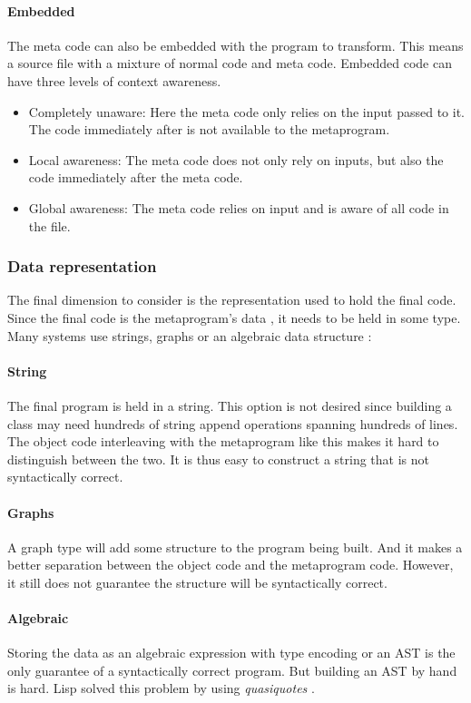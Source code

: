 \paragraph{Embedded}
The meta code can also be embedded with the program to transform.
This means a source file with a mixture of normal code and meta code.
Embedded code can have three levels of context awareness. \cite{savidis_19_01}

\begin{itemize}
	\item Completely unaware: Here the meta code only relies on the input passed to it.
	      The code immediately after is not available to the metaprogram.
	\item Local awareness: The meta code does not only rely on inputs, but also the code immediately after the meta code.
	\item Global awareness: The meta code relies on input and is aware of all code in the file.
\end{itemize}

\subsubsection{Data representation}
The final dimension to consider is the representation used to hold the final code.
Since the final code is the metaprogram's data \cite{bawden_99_01}, it needs to be held in some type.
Many systems use strings, graphs or an algebraic data structure \cite{sheard_01_01}:

\paragraph{String}
The final program is held in a string.
This option is not desired since building a class may need hundreds of string append operations spanning hundreds of lines.
The object code interleaving with the metaprogram like this makes it hard to distinguish between the two.
It is thus easy to construct a string that is not syntactically correct.

\paragraph{Graphs}
A graph type will add some structure to the program being built.
And it makes a better separation between the object code and the metaprogram code.
However, it still does not guarantee the structure will be syntactically correct.

\paragraph{Algebraic}
Storing the data as an algebraic expression with type encoding or an AST is the only guarantee of a syntactically correct program.
But building an AST by hand is hard.
Lisp solved this problem by using \textit{quasiquotes} \cite{bawden_99_01}.

